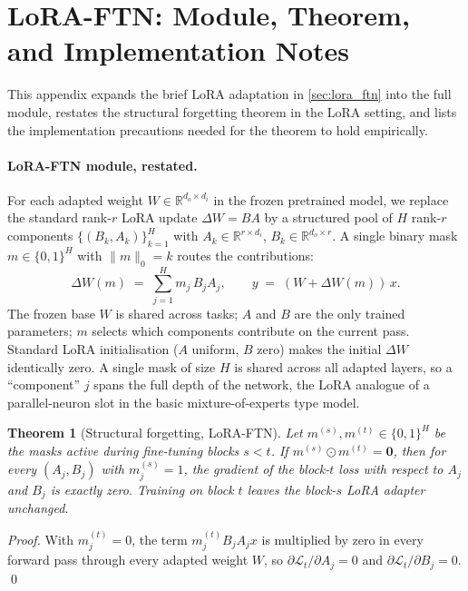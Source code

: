 \documentclass{article}
\theoremstyle{plain}
\newtheorem{theorem}{Theorem}[section]
\theoremstyle{remark}
\begin{document}
\section{LoRA-FTN: Module, Theorem, and Implementation Notes}
\label{app:lora_ftn}

This appendix expands the brief LoRA adaptation in \cref{sec:lora_ftn} into the full module, restates the structural forgetting theorem in the LoRA setting, and lists the implementation precautions needed for the theorem to hold empirically.

\paragraph{LoRA-FTN module, restated.}
For each adapted weight $W \in \mathbb{R}^{d_o\times d_i}$ in the frozen pretrained model, we replace the standard rank-$r$ LoRA update $\Delta W = BA$ by a structured pool of $H$ rank-$r$ components $\{(B_k,A_k)\}_{k=1}^{H}$ with $A_k\in\mathbb{R}^{r\times d_i}$, $B_k\in\mathbb{R}^{d_o\times r}$. A single binary mask $m\in\{0,1\}^H$ with $\|m\|_0=k$ routes the contributions:
\begin{equation}
\Delta W(m) \;=\; \sum_{j=1}^{H} m_j\, B_j A_j, \qquad y \;=\; (W + \Delta W(m))\,x.
\end{equation}
The frozen base $W$ is shared across tasks; $A$ and $B$ are the only trained parameters; $m$ selects which components contribute on the current pass. Standard LoRA initialisation ($A$ uniform, $B$ zero) makes the initial $\Delta W$ identically zero. A single mask of size $H$ is shared across all adapted layers, so a ``component'' $j$ spans the full depth of the network, the LoRA analogue of a parallel-neuron slot in the basic mixture-of-experts type model.

\begin{theorem}[Structural forgetting, LoRA-FTN]
\label{thm:lora_isolation}
Let $m^{(s)},m^{(t)}\in\{0,1\}^H$ be the masks active during fine-tuning blocks $s<t$. If $m^{(s)}\odot m^{(t)} = \mathbf{0}$, then for every $(A_j,B_j)$ with $m^{(s)}_j=1$, the gradient of the block-$t$ loss with respect to $A_j$ and $B_j$ is exactly zero. Training on block $t$ leaves the block-$s$ LoRA adapter unchanged.
\end{theorem}
\begin{proof}
With $m^{(t)}_j=0$, the term $m^{(t)}_j B_j A_j x$ is multiplied by zero in every forward pass through every adapted weight $W$, so $\partial\mathcal{L}_t/\partial A_j=0$ and $\partial\mathcal{L}_t/\partial B_j=0$. \qed
\end{proof}
\end{document}
